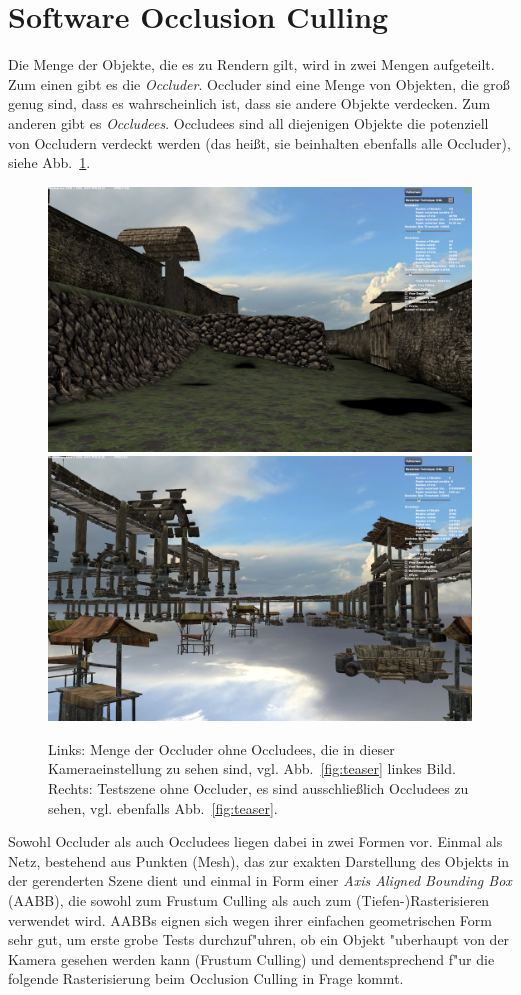 \documentclass[journal]{vgtc}
\begin{document}
\section{Software Occlusion Culling}
Die Menge der Objekte, die es zu Rendern gilt, wird in zwei Mengen aufgeteilt.
Zum einen gibt es die \textit{Occluder}. Occluder sind eine Menge von Objekten, die gro{\ss} genug sind, dass es wahrscheinlich ist, dass sie andere Objekte verdecken.
Zum anderen gibt es \textit{Occludees}. Occludees sind all diejenigen Objekte die potenziell von Occludern verdeckt werden (das hei{\ss}t, sie beinhalten ebenfalls alle Occluder), siehe Abb.\ \ref{fig:objects}.
\begin{figure}%
\includegraphics[width=0.5\columnwidth]{images/Occluder.png}%
\includegraphics[width=0.5\columnwidth]{images/Occludees.png}%
\caption{Links: Menge der Occluder ohne Occludees, die in dieser Kameraeinstellung zu sehen sind, vgl. Abb.\ \ref{fig:teaser} linkes Bild. Rechts: Testszene ohne Occluder, es sind ausschlie{\ss}lich Occludees zu sehen, vgl. ebenfalls Abb.\ \ref{fig:teaser}.}%
\label{fig:objects}%
\end{figure}
Sowohl Occluder als auch Occludees liegen dabei in zwei Formen vor.
Einmal als Netz, bestehend aus Punkten (Mesh), das zur exakten Darstellung des Objekts in der gerenderten Szene dient und einmal in Form einer \textit{Axis Aligned Bounding Box} (AABB), die sowohl zum Frustum Culling als auch zum (Tiefen-)Rasterisieren verwendet wird.
AABBs eignen sich wegen ihrer einfachen geometrischen Form sehr gut, um erste grobe Tests durchzuf"uhren, ob ein Objekt "uberhaupt von der Kamera gesehen werden kann (Frustum Culling) und dementsprechend f"ur die folgende Rasterisierung beim Occlusion Culling in Frage kommt. \\
\end{document}
